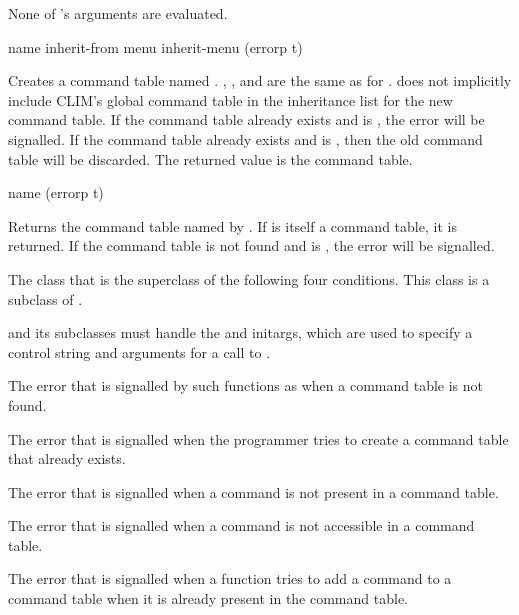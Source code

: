 None of 's arguments are evaluated.


 {name \key inherit-from menu inherit-menu (errorp t)}

Creates a command table named .  , , and
 are the same as for .
 does not implicitly include CLIM's global command table
in the inheritance list for the new command table.  If the command table already
exists and  is , the 
error will be signalled.  If the command table already exists and 
is , then the old command table will be discarded.  The returned
value is the command table.


 {name \key (errorp t)}

Returns the command table named by .  If  is itself a
command table, it is returned.  If the command table is not found and
 is , the  error will be
signalled.



The class that is the superclass of the following four conditions.  This class
is a subclass of .

 and its subclasses must handle the 
and  initargs, which are used to specify a control string
and arguments for a call to .


The error that is signalled by such functions as  when a
command table is not found.


The error that is signalled when the programmer tries to create a command table
that already exists.


The error that is signalled when a command is not present in a command table.


The error that is signalled when a command is not accessible in a command table.


The error that is signalled when a function tries to add a command to a command
table when it is already present in the command table.


